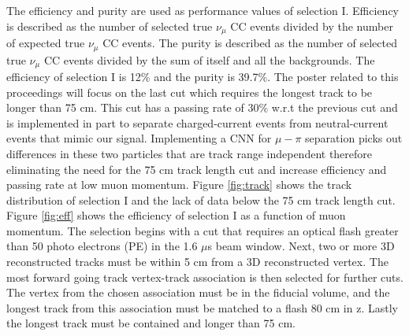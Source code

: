 The efficiency and purity are used as performance values of selection I. Efficiency is described as the number of selected true $\nu_{\mu}$ CC events divided by the number of expected true $\nu_{\mu}$ CC events. The purity is described as the number of selected true $\nu_{\mu}$ CC events divided by the sum of itself and all the backgrounds. The efficiency of selection I is 12\% and the purity is 39.7\%. The poster related to this proceedings will focus on the last cut which requires the longest track to be longer than 75 cm. This cut has a passing rate of 30\% w.r.t the previous cut and is implemented in part to separate charged-current events from neutral-current events that mimic our signal. Implementing a CNN for $\mu-\pi$ separation picks out differences in these two particles that are track range independent therefore eliminating the need for the 75 cm track length cut and increase efficiency and passing rate at low muon momentum. Figure \ref{fig:track} shows the track distribution of selection I and the lack of data below  the 75 cm track length cut. Figure \ref{fig:eff} shows the efficiency of selection I as a function of muon momentum.     
The selection begins with a cut that requires an optical flash greater than 50 photo electrons (PE) in the 1.6 $\mu$s beam window. Next, two or more 3D reconstructed tracks must be within 5 cm from a 3D reconstructed vertex. The most forward going track vertex-track association is then selected for further cuts. The vertex from the chosen association must be in the fiducial volume, and the longest track from this association must be matched to a flash 80 cm in z. Lastly the longest track must be contained and longer than 75 cm.       

